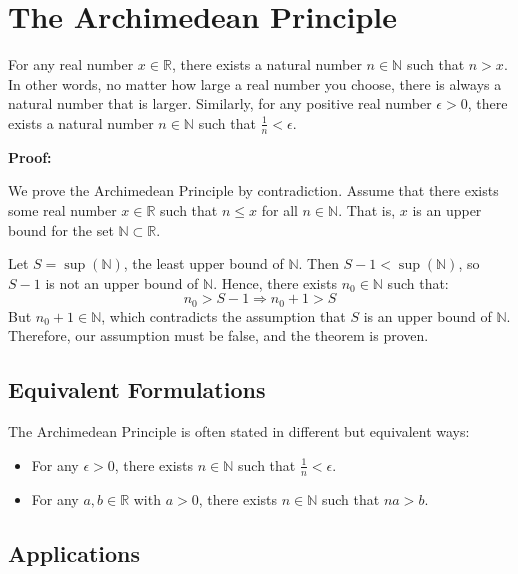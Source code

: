 \newpage
\section{The Archimedean Principle}

For any real number \( x \in \mathbb{R} \), there exists a natural number \( n \in \mathbb{N} \) such that \( n > x \).
\newline
In other words, no matter how large a real number you choose, there is always a natural number that is larger. Similarly, for any positive real number \( \epsilon > 0 \), there exists a natural number \( n \in \mathbb{N} \) such that \( \frac{1}{n} < \epsilon \).

\textbf{Proof:}

We prove the Archimedean Principle by contradiction.
\newline
Assume that there exists some real number \( x \in \mathbb{R} \) such that \( n \leq x \) for all \( n \in \mathbb{N} \). That is, \( x \) is an upper bound for the set \( \mathbb{N} \subset \mathbb{R} \).

Let \( S = \sup(\mathbb{N}) \), the least upper bound of \( \mathbb{N} \). Then \( S - 1 < \sup(\mathbb{N}) \), so \( S - 1 \) is not an upper bound of \( \mathbb{N} \). Hence, there exists \( n_0 \in \mathbb{N} \) such that:
\[
	n_0 > S - 1 \Rightarrow n_0 + 1 > S
\]
But \( n_0 + 1 \in \mathbb{N} \), which contradicts the assumption that \( S \) is an upper bound of \( \mathbb{N} \). Therefore, our assumption must be false, and the theorem is proven.

\QED

\subsection{Equivalent Formulations}

The Archimedean Principle is often stated in different but equivalent ways:

\begin{itemize}[label=\(-\)]
	\item For any \( \epsilon > 0 \), there exists \( n \in \mathbb{N} \) such that \( \frac{1}{n} < \epsilon \).
	\item For any \( a, b \in \mathbb{R} \) with \( a > 0 \), there exists \( n \in \mathbb{N} \) such that \( na > b \).
\end{itemize}

\subsection{Applications}

